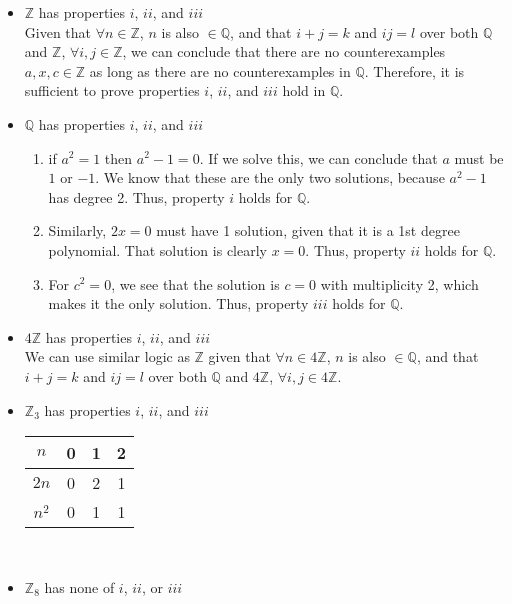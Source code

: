 \documentclass{article}
\begin{document}
  \begin{itemize}
  \item $\mathbb{Z}$ has properties $i$, $ii$, and $iii$\\
    Given that $\forall n \in \mathbb{Z}$, $n$ is also $\in \mathbb{Q}$, and that $i+j=k$ and $ij=l$ over both $\mathbb{Q}$ and $\mathbb{Z}$, $\forall i, j \in \mathbb{Z}$, we can conclude that there are no counterexamples $a, x, c \in \mathbb{Z}$ as long as there are no counterexamples in $\mathbb{Q}$. Therefore, it is sufficient to prove properties $i$, $ii$, and $iii$ hold in $\mathbb{Q}$. 
  \item $\mathbb{Q}$ has properties $i$, $ii$, and $iii$
    \begin{enumerate}
    \item if $a^2 = 1$ then $a^2-1 = 0$. If we solve this, we can conclude that $a$ must be $1$ or $-1$. We know that these are the only two solutions, because $a^2-1$ has degree 2. Thus, property $i$ holds for $\mathbb{Q}$.
    \item Similarly, $2x = 0$ must have 1 solution, given that it is a 1st degree polynomial. That solution is clearly $x = 0$. Thus, property $ii$ holds for $\mathbb{Q}$.
    \item For $c^2=0$, we see that the solution is $c=0$ with multiplicity 2, which makes it the only solution. Thus, property $iii$ holds for $\mathbb{Q}$.
    \end{enumerate}
  \item $4\mathbb{Z}$ has properties $i$, $ii$, and $iii$\\
    We can use similar logic as $\mathbb{Z}$ given that $\forall n \in 4\mathbb{Z}$, $n$ is also $\in \mathbb{Q}$, and that $i+j=k$ and $ij=l$ over both $\mathbb{Q}$ and $4\mathbb{Z}$, $\forall i, j \in 4\mathbb{Z}$.
  \item $\mathbb{Z}_3$ has properties $i$, $ii$, and $iii$\\
    \begin{tabular} {|c|c|c|c|}
      \hline $n$   & 0 & 1 & 2\\
      \hline $2n$  & 0 & 2 & 1\\
      \hline $n^2$ & 0 & 1 & 1\\                       
      \hline 
    \end{tabular}\\
  \item $\mathbb{Z}_8$ has none of $i$, $ii$, or $iii$\\
    \begin{tabular} {|c|c|c|c|c|c|c|c|c|}

\end{tabular}
\end{itemize}
\end{document}
